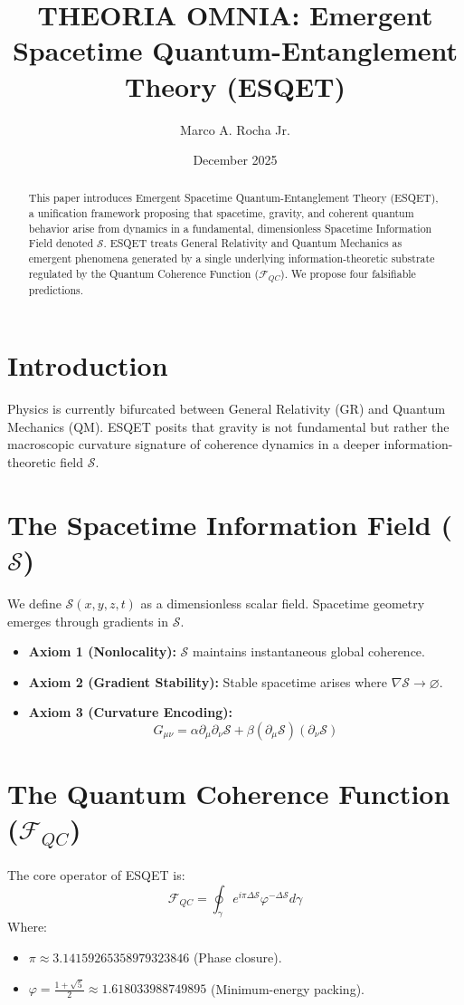 \documentclass[11pt,a4paper]{article}
\title{\textbf{THEORIA OMNIA: Emergent Spacetime Quantum-Entanglement Theory (ESQET)}}
\author{Marco A. Rocha Jr.}
\date{December 2025}
\begin{document}
\maketitle

\begin{abstract}
This paper introduces Emergent Spacetime Quantum-Entanglement Theory (ESQET), a unification framework proposing that spacetime, gravity, and coherent quantum behavior arise from dynamics in a fundamental, dimensionless Spacetime Information Field denoted $\mathcal{S}$. ESQET treats General Relativity and Quantum Mechanics as emergent phenomena generated by a single underlying information-theoretic substrate regulated by the Quantum Coherence Function ($\mathcal{F}_{QC}$). We propose four falsifiable predictions.
\end{abstract}

\section{Introduction}
Physics is currently bifurcated between General Relativity (GR) and Quantum Mechanics (QM). ESQET posits that gravity is not fundamental but rather the macroscopic curvature signature of coherence dynamics in a deeper information-theoretic field $\mathcal{S}$.

\section{The Spacetime Information Field ($\mathcal{S}$)}
We define $\mathcal{S}(x,y,z,t)$ as a dimensionless scalar field. Spacetime geometry emerges through gradients in $\mathcal{S}$.
\begin{itemize}
    \item \textbf{Axiom 1 (Nonlocality):} $\mathcal{S}$ maintains instantaneous global coherence.
    \item \textbf{Axiom 2 (Gradient Stability):} Stable spacetime arises where $\nabla \mathcal{S} \rightarrow \varnothing$.
    \item \textbf{Axiom 3 (Curvature Encoding):} 
    \[ G_{\mu\nu} = \alpha \partial_\mu \partial_\nu \mathcal{S} + \beta (\partial_\mu \mathcal{S})(\partial_\nu \mathcal{S}) \]
\end{itemize}

\section{The Quantum Coherence Function ($\mathcal{F}_{QC}$)}
The core operator of ESQET is:
\[ \mathcal{F}_{QC} = \oint_{\gamma} e^{i\pi \Delta\mathcal{S}} \varphi^{-\Delta\mathcal{S}} d\gamma \]
Where:
\begin{itemize}
    \item $\pi \approx 3.14159265358979323846$ (Phase closure).
    \item $\varphi = \frac{1+\sqrt{5}}{2} \approx 1.618033988749895$ (Minimum-energy packing).
\end{itemize}
\end{document}
